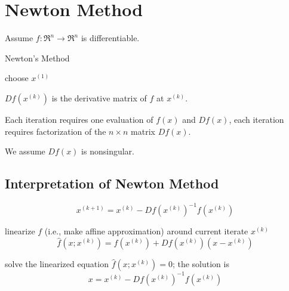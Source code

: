 \section{Newton Method}

\begin{proposition}
    Assume $ f: \mathfrak{R}^{n} \rightarrow \mathfrak{R}^{n} $ is differentiable.
\end{proposition}



\begin{algorithm}
    \caption{Newton's Method}
     choose $ x^{(1)} $\;
\end{algorithm}



$ D f\left(x^{(k)}\right) $ is the derivative matrix of $ f $ at $ x^{(k)} $. 

Each iteration requires one evaluation of $ f(x) $ and $ D f(x) $, each iteration requires factorization of the $ n \times n $ matrix $ D f(x) $.

\begin{proposition}
    We assume $ D f(x) $ is nonsingular.
\end{proposition}

\subsection{Interpretation of Newton Method}

\begin{equation}
x^{(k+1)}=x^{(k)}-D f\left(x^{(k)}\right)^{-1} f\left(x^{(k)}\right)
\end{equation}

linearize $ f $ (i.e., make affine approximation) around current iterate $ x^{(k)} $
\begin{equation}
\hat{f}\left(x ; x^{(k)}\right)=f\left(x^{(k)}\right)+D f\left(x^{(k)}\right)\left(x-x^{(k)}\right)
\end{equation}

solve the linearized equation $ \hat{f}\left(x ; x^{(k)}\right)=0 $; the solution is
\begin{equation}
x=x^{(k)}-D f\left(x^{(k)}\right)^{-1} f\left(x^{(k)}\right)
\end{equation}

